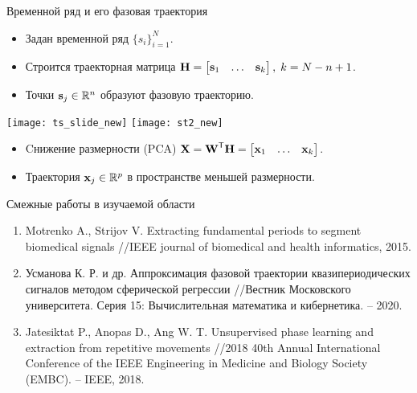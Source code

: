 \documentclass{beamer}
\begin{document}
\begin{frame}{Временной ряд и его фазовая траектория}
\begin{itemize}
\item[] Задан временной ряд  $\{ s_i \}_{i = 1}^N$. \\

\item[] Строится траекторная матрица $\mbox{\bfseries H} = \begin{bmatrix} \mbox{\bfseries s}_1 & \dots & \mbox{\bfseries s}_{k} \end{bmatrix} ,\;k = N - n + 1$.\\

\item[] Точки $\mbox{\bfseries s}_j\in\mathbb{R}^n$\; образуют фазовую траекторию.
\end{itemize}
\hfil\hfil\texttt{[image: ts\_slide\_new]}
\hfil\hfil\texttt{[image: st2\_new]}
\begin{itemize}
\item[] Cнижение размерности (PCA) $\mbox{\bfseries X} =\mbox{\bfseries W}^{\mathsf{T}} \mbox{\bfseries H}  = \begin{bmatrix} \mbox{\bfseries x}_1 & \dots & \mbox{\bfseries x}_{k} \end{bmatrix}$.\\
\item[] Траектория $\mbox{\bfseries x}_j\in\mathbb{R}^p$\; в пространстве меньшей размерности.
\end{itemize}
\end{frame}
\begin{frame}{Смежные работы в изучаемой области}
    \begin{enumerate}
	\item Motrenko A., Strijov V. Extracting fundamental periods to segment biomedical signals //IEEE journal of biomedical and health informatics, 2015.
	\item Усманова К. Р. и др. Аппроксимация фазовой траектории квазипериодических сигналов методом сферической регрессии //Вестник Московского университета. Серия 15: Вычислительная математика и кибернетика. – 2020.
	\item Jatesiktat P., Anopas D., Ang W. T. Unsupervised phase learning and extraction from repetitive movements //2018 40th Annual International Conference of the IEEE Engineering in Medicine and Biology Society (EMBC). – IEEE, 2018.


\end{enumerate}
\end{frame}
\end{document}
